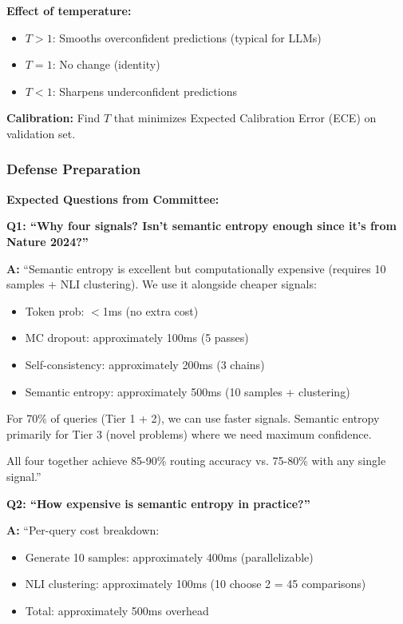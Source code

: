 \documentclass[12pt,a4paper]{article}
\theoremstyle{definition}
\begin{document}
\textbf{Effect of temperature:}
\begin{itemize}
    \item $T > 1$: Smooths overconfident predictions (typical for LLMs)
    \item $T = 1$: No change (identity)
    \item $T < 1$: Sharpens underconfident predictions
\end{itemize}

\textbf{Calibration:} Find $T$ that minimizes Expected Calibration Error (ECE) on validation set.

\subsubsection{Defense Preparation}

\begin{defensebox}
\textbf{Expected Questions from Committee:}

\textbf{Q1: ``Why four signals? Isn't semantic entropy enough since it's from Nature 2024?''}

\textbf{A:} ``Semantic entropy is excellent but computationally expensive (requires 10 samples + NLI clustering). We use it alongside cheaper signals:
\begin{itemize}
    \item Token prob: $<$1ms (no extra cost)
    \item MC dropout: approximately 100ms (5 passes)
    \item Self-consistency: approximately 200ms (3 chains)
    \item Semantic entropy: approximately 500ms (10 samples + clustering)
\end{itemize}

For 70\% of queries (Tier 1 + 2), we can use faster signals. Semantic entropy primarily for Tier 3 (novel problems) where we need maximum confidence.

All four together achieve 85-90\% routing accuracy vs. 75-80\% with any single signal.''

\textbf{Q2: ``How expensive is semantic entropy in practice?''}

\textbf{A:} ``Per-query cost breakdown:
\begin{itemize}
    \item Generate 10 samples: approximately 400ms (parallelizable)
    \item NLI clustering: approximately 100ms (10 choose 2 = 45 comparisons)
    \item Total: approximately 500ms overhead
\end{itemize}


\end{defensebox}
\end{document}
